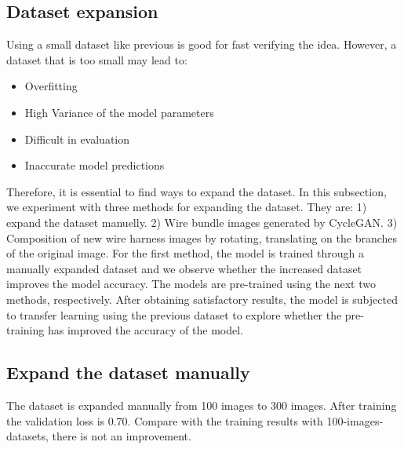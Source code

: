 \subsection{Dataset expansion}
	Using a small dataset like previous is good for fast verifying the idea. However, a dataset that is too small may lead to: 
	\begin{itemize}
		\item Overfitting
		\item High Variance of the model parameters
		\item Difficult in evaluation
		\item Inaccurate model predictions
	\end{itemize}
	Therefore, it is essential to find ways to expand the dataset. In this subsection, we experiment with three methods for expanding the dataset. They are:
	1) expand the dataset manuelly. 2) Wire bundle images generated by CycleGAN. 3) Composition of new wire harness images by rotating, translating on the 
	branches of the original image. For the first method, the model is trained through a manually expanded dataset and we observe whether the increased dataset 
	improves the model accuracy. The models are pre-trained using the next two methods, respectively. After obtaining satisfactory results, the model is subjected 
	to transfer learning using the previous dataset to explore whether the pre-training has improved the accuracy of the model.
\subsection{Expand the dataset manually}
	The dataset is expanded manually from 100 images to 300 images. After training the validation loss is 0.70. Compare with the training results with 100-images-datasets,
	there is not an improvement. 
